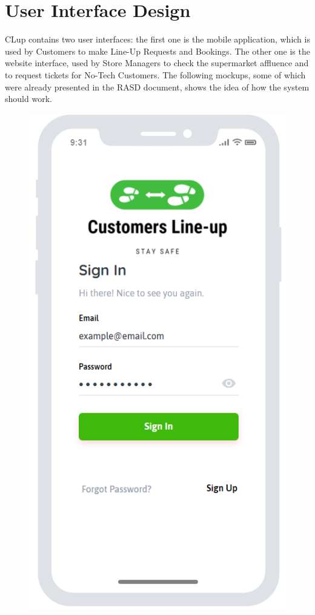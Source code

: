 \chapter{User Interface Design}

CLup contains two user interfaces: the first one is the mobile application, which is used by Customers to make Line-Up Requests and Bookings. The other one is the website interface, used by Store Managers to check the supermarket affluence and to request tickets for No-Tech Customers. The following mockups, some of which were already presented in the RASD document, shows the idea of how the system should work. \\
\begin{figure}[H]
\begin{minipage}{0.3\linewidth} 
\includegraphics[width=\textwidth]{./Images/MockupLogo/mockLogin}

\end{minipage}
\end{figure}
